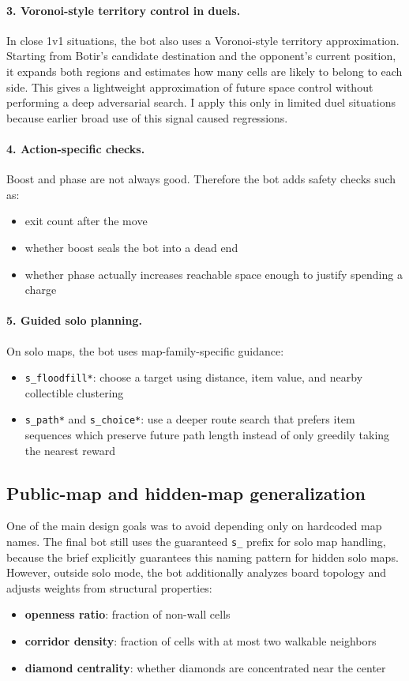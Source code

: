 \documentclass[11pt,a4paper]{article}
\begin{document}
\paragraph{3. Voronoi-style territory control in duels.}
In close 1v1 situations, the bot also uses a Voronoi-style territory approximation. Starting from Botir's candidate destination and the opponent's current position, it expands both regions and estimates how many cells are likely to belong to each side. This gives a lightweight approximation of future space control without performing a deep adversarial search. I apply this only in limited duel situations because earlier broad use of this signal caused regressions.

\paragraph{4. Action-specific checks.}
Boost and phase are not always good. Therefore the bot adds safety checks such as:
\begin{itemize}[leftmargin=*]
    \item exit count after the move
    \item whether boost seals the bot into a dead end
    \item whether phase actually increases reachable space enough to justify spending a charge
\end{itemize}

\paragraph{5. Guided solo planning.}
On solo maps, the bot uses map-family-specific guidance:
\begin{itemize}[leftmargin=*]
    \item \texttt{s\_floodfill*}: choose a target using distance, item value, and nearby collectible clustering
    \item \texttt{s\_path*} and \texttt{s\_choice*}: use a deeper route search that prefers item sequences which preserve future path length instead of only greedily taking the nearest reward
\end{itemize}

\subsection{Public-map and hidden-map generalization}
One of the main design goals was to avoid depending only on hardcoded map names. The final bot still uses the guaranteed \texttt{s\_} prefix for solo map handling, because the brief explicitly guarantees this naming pattern for hidden solo maps. However, outside solo mode, the bot additionally analyzes board topology and adjusts weights from structural properties:
\begin{itemize}[leftmargin=*]
    \item \textbf{openness ratio}: fraction of non-wall cells
    \item \textbf{corridor density}: fraction of cells with at most two walkable neighbors
    \item \textbf{diamond centrality}: whether diamonds are concentrated near the center
\end{itemize}
\end{document}
